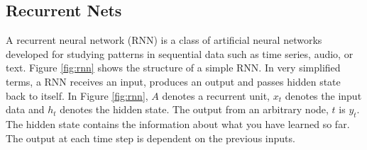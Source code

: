 \subsection{Recurrent Nets} \label{sec:reccurent_nets}

A recurrent neural network (RNN) is a class of artificial neural networks developed for studying patterns in sequential data such as time series, audio, or text. Figure \ref{fig:rnn} shows the structure of a simple RNN. In very simplified terms, a RNN receives an input, produces an output and passes hidden state back to itself. In Figure \ref{fig:rnn}, $A$ denotes a recurrent unit, $x_t$ denotes the input data and  $h_t$ denotes the hidden state. The output from an arbitrary node, $t$ is $y_t$. %
The hidden state contains the information about what you have learned so far. The output at each time step is dependent on the previous inputs. 

